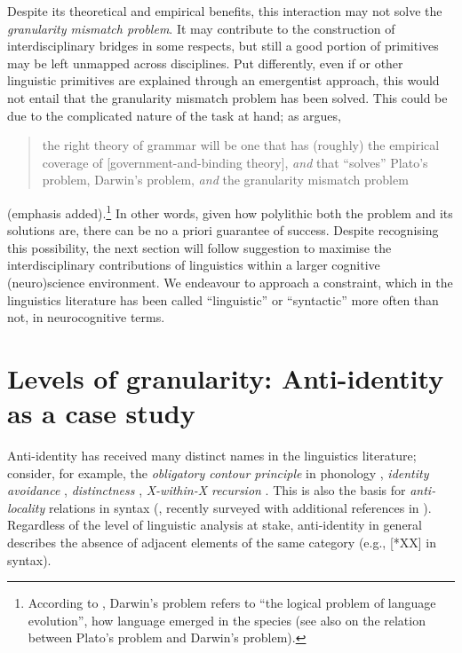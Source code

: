 \documentclass[output=paper]{langsci/langscibook}
\begin{document}
Despite its theoretical and empirical benefits, this interaction may not solve
the \emph{granularity mismatch problem}. It may contribute to the
construction of interdisciplinary bridges in some respects, but still a good
portion of primitives may be left unmapped across disciplines. Put differently,
even if  or other linguistic primitives are explained through an
emergentist approach, this would not entail that the granularity mismatch
problem has been solved. This could be due to the complicated nature of the
task at hand; as \citet[156--157]{Hornstein2009} argues, \blockquote{the right
    theory of grammar will be one that has (roughly) the empirical coverage of
    [government-and-binding theory], \emph{and} that \enquote{solves} Plato’s
    problem, Darwin’s problem, \emph{and} the granularity mismatch problem}
    (emphasis added).\footnote{According to \citet{Hornstein2009}, Darwin’s
    problem refers to “the logical problem of language evolution”, how language
emerged in the species (see also \citealt{BoeGro2007} on the relation between
Plato’s problem and Darwin’s problem).} In other words, given how polylithic
both the problem and its solutions are, there can be no a priori
guarantee of success.  Despite recognising this possibility, the next section
will follow  suggestion to maximise the interdisciplinary
contributions of linguistics within a larger cognitive (neuro)science
environment. We endeavour to approach a constraint, which in the linguistics
literature has been called \enquote{linguistic} or \enquote{syntactic} more
often than not, in neurocognitive terms.

\section{Levels of granularity: Anti-identity as a case study}\label{sec:25:3}

Anti-identity has received many distinct names in the linguistics literature;
consider, for example, the \emph{obligatory contour principle} in phonology
\citep{Odden1986}, \emph{identity avoidance} \parencite{vanRiemsdijk2008},
\emph{distinctness} \citep{Richards2010}, \emph{X-within-X recursion}
\parencite{ArsHin2012}. This is also the basis for \emph{anti-locality}
relations in syntax (\citealt{Grohmann2003}, recently surveyed with additional
references in \citealt{Grohmann2011}). Regardless of the level of linguistic
analysis at stake, anti-identity in general describes the absence of adjacent
elements of the same category (e.g., [*XX] in syntax).
\end{document}
